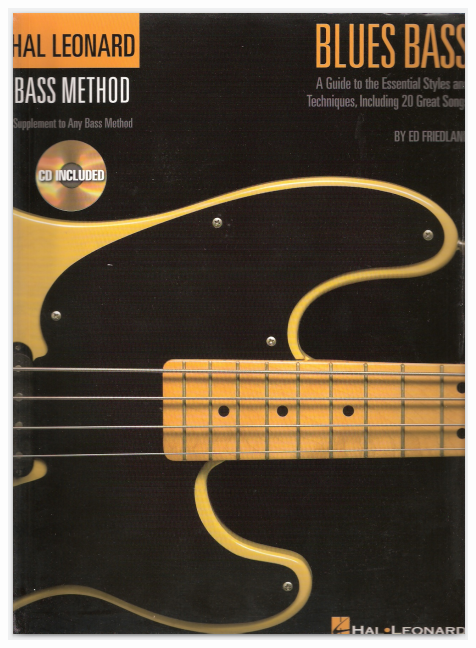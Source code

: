 \documentclass[a4paper]{book}
\begin{document}
\begin{center}
\includegraphics[width=12.169cm,height=16.718cm]{lebluessupportsmethodes-img151.png}
\end{center}
\end{document}
